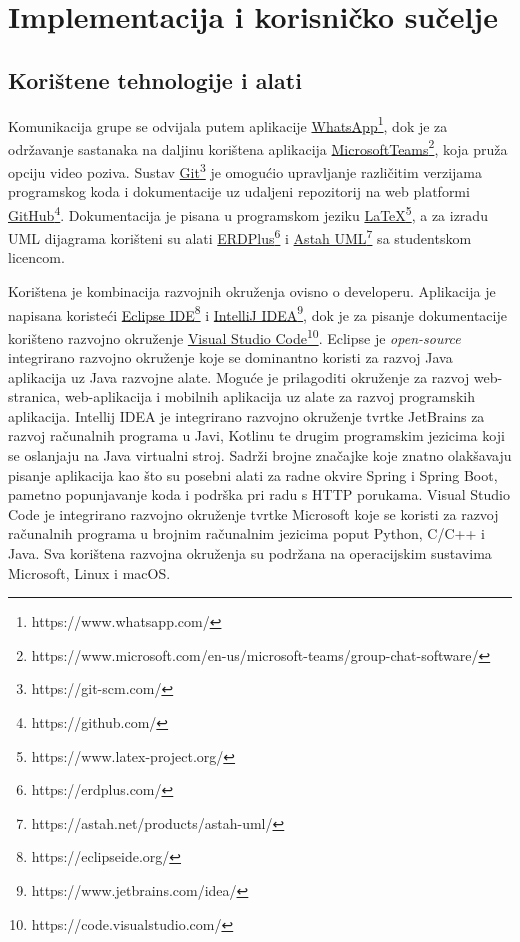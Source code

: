 \chapter{Implementacija i korisničko sučelje}
		
		
		\section{Korištene tehnologije i alati}
		
			Komunikacija grupe se odvijala putem aplikacije \href{https://www.whatsapp.com/}{WhatsApp\footnote{https://www.whatsapp.com/}}, dok je za održavanje sastanaka na daljinu korištena aplikacija \href{https://www.microsoft.com/en-us/microsoft-teams/group-chat-software/}{MicrosoftTeams\footnote{https://www.microsoft.com/en-us/microsoft-teams/group-chat-software/}}, koja pruža opciju video poziva. Sustav \href{https://git-scm.com/}{Git\footnote{https://git-scm.com/}} je omogućio upravljanje različitim verzijama programskog koda i dokumentacije uz udaljeni repozitorij na web platformi \href{https://github.com/}{GitHub\footnote{https://github.com/}}. Dokumentacija je pisana u programskom jeziku \href{https://www.latex-project.org/}{LaTeX\footnote{https://www.latex-project.org/}}, a za izradu UML dijagrama korišteni su alati \href{https://erdplus.com/}{ERDPlus\footnote{https://erdplus.com/}} i \href{https://astah.net/products/astah-uml/}{Astah UML\footnote{https://astah.net/products/astah-uml/}} sa studentskom licencom.
				
			\indent Korištena je kombinacija razvojnih okruženja ovisno o developeru. Aplikacija je napisana koristeći \href{https://eclipseide.org/}{Eclipse IDE\footnote{https://eclipseide.org/}} i \href{https://www.jetbrains.com/idea/}{IntelliJ IDEA\footnote{https://www.jetbrains.com/idea/}}, dok je za pisanje dokumentacije korišteno razvojno okruženje \href{https://code.visualstudio.com/}{Visual Studio Code\footnote{https://code.visualstudio.com/}}. Eclipse je \textit{open-source} integrirano razvojno okruženje koje se dominantno koristi za razvoj Java aplikacija uz Java razvojne alate. Moguće je prilagoditi okruženje za razvoj web-stranica, web-aplikacija i mobilnih aplikacija uz alate za razvoj programskih aplikacija. Intellij IDEA je integrirano razvojno okruženje tvrtke JetBrains za razvoj računalnih programa u Javi, Kotlinu te drugim programskim jezicima koji se oslanjaju na Java virtualni stroj. Sadrži brojne značajke koje znatno olakšavaju pisanje aplikacija kao što su posebni alati za radne okvire Spring i Spring Boot, pametno popunjavanje koda i podrška pri radu s HTTP porukama. Visual Studio Code je integrirano razvojno okruženje tvrtke Microsoft koje se koristi za razvoj računalnih programa u brojnim računalnim jezicima poput Python, C/C++ i Java. Sva korištena razvojna okruženja su podržana na operacijskim sustavima Microsoft, Linux i macOS. \\
				
